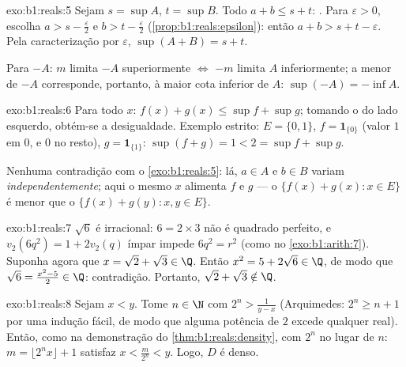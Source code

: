 \begin{solution}{exo:b1:reals:5}
Sejam $s = \sup A$, $t = \sup B$. Todo $a + b \leq s + t$: . Para $\varepsilon > 0$, escolha $a > s - \frac\varepsilon2$ e
$b > t - \frac\varepsilon2$ (\cref{prop:b1:reals:epsilon}): então $a +
b > s + t - \varepsilon$. Pela caracterização por $\varepsilon$,
$\sup(A+B) = s + t$.

Para $-A$: $m$ limita $-A$ superiormente $\iff$ $-m$ limita $A$
inferiormente; a menor  de $-A$ corresponde, portanto, à
maior cota inferior de $A$: $\sup(-A) = -\inf A$.
\end{solution}

\begin{solution}{exo:b1:reals:6}
Para todo $x$: $f(x) + g(x) \leq \sup f + \sup g$; tomando o  do
lado esquerdo, obtém-se a desigualdade. Exemplo estrito: $E = \{0, 1\}$,
$f = \mathbf{1}_{\{0\}}$ (valor $1$ em $0$, e $0$ no resto), $g =
\mathbf{1}_{\{1\}}$: $\sup(f + g) = 1 < 2 = \sup f + \sup g$.

Nenhuma contradição com o \cref{exo:b1:reals:5}: lá, $a \in A$ e $b
\in B$ variam \emph{independentemente}; aqui o mesmo $x$ alimenta $f$
e $g$ --- o  $\{f(x) + g(x) : x \in E\}$ é menor que o
 $\{f(x) + g(y) : x, y \in E\}$.
\end{solution}

\begin{solution}{exo:b1:reals:7}
$\sqrt 6$ é irracional: $6 = 2 \times 3$ não é quadrado perfeito,
e $v_2(6q^2) = 1 + 2v_2(q)$ ímpar impede $6q^2 = r^2$ (como no
\cref{exo:b1:arith:7}). Suponha agora que $x = \sqrt 2 + \sqrt 3 \in \Q$.
Então $x^2 = 5 + 2\sqrt 6 \in \Q$, de modo que $\sqrt 6 = \frac{x^2 - 5}{2} \in
\Q$: contradição. Portanto, $\sqrt 2 + \sqrt 3 \notin \Q$.
\end{solution}

\begin{solution}{exo:b1:reals:8}
Sejam $x < y$. Tome $n \in \N$ com $2^n > \frac{1}{y - x}$ (Arquimedes:
$2^n \geq n + 1$ por uma indução fácil, de modo que alguma potência de $2$
excede qualquer real). Então, como na demonstração do \cref{thm:b1:reals:density}, com
$2^n$ no lugar de $n$: $m = \lfloor 2^n x \rfloor + 1$ satisfaz $x <
\frac{m}{2^n} < y$. Logo, $D$ é denso.
\end{solution}

